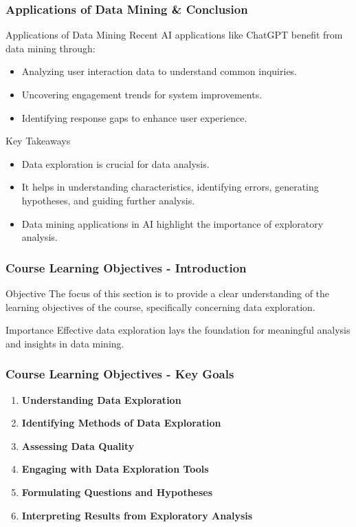 \documentclass[aspectratio=169]{beamer}
\begin{document}
\begin{frame}[fragile]
    \frametitle{Applications of Data Mining & Conclusion}
    \begin{block}{Applications of Data Mining}
        Recent AI applications like ChatGPT benefit from data mining through:
        \begin{itemize}
            \item Analyzing user interaction data to understand common inquiries.
            \item Uncovering engagement trends for system improvements.
            \item Identifying response gaps to enhance user experience.
        \end{itemize}
    \end{block}
    
    \begin{block}{Key Takeaways}
        \begin{itemize}
            \item Data exploration is crucial for data analysis.
            \item It helps in understanding characteristics, identifying errors, generating hypotheses, and guiding further analysis.
            \item Data mining applications in AI highlight the importance of exploratory analysis.
        \end{itemize}
    \end{block}
\end{frame}

\begin{frame}[fragile]
    \frametitle{Course Learning Objectives - Introduction}
    \begin{block}{Objective}
        The focus of this section is to provide a clear understanding of the learning objectives of the course, specifically concerning data exploration.
    \end{block}
    \begin{block}{Importance}
        Effective data exploration lays the foundation for meaningful analysis and insights in data mining.
    \end{block}
\end{frame}

\begin{frame}[fragile]
    \frametitle{Course Learning Objectives - Key Goals}
    \begin{enumerate}
        \item \textbf{Understanding Data Exploration}
        \item \textbf{Identifying Methods of Data Exploration}
        \item \textbf{Assessing Data Quality}
        \item \textbf{Engaging with Data Exploration Tools}
        \item \textbf{Formulating Questions and Hypotheses}
        \item \textbf{Interpreting Results from Exploratory Analysis}
    \end{enumerate}
\end{frame}
\end{document}
